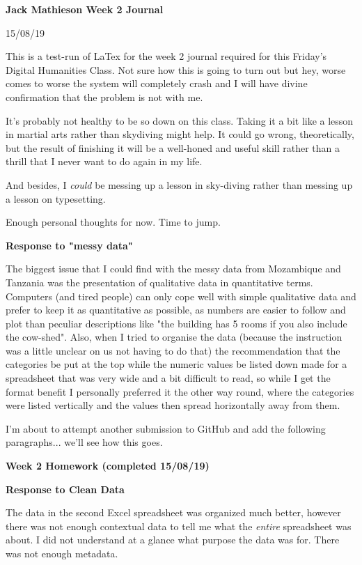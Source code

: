 \documentclass{article}
\begin{document}
\textbf{Jack Mathieson Week 2 Journal}

15/08/19

This is a test-run of LaTex for the week 2 journal required for this Friday's Digital Humanities Class. Not sure how this is going to turn out but hey, worse comes to worse the system will completely crash and I will have divine confirmation that the problem is not with me.

It's probably not healthy to be so down on this class. Taking it a bit like a lesson in martial arts rather than skydiving might help. It could go wrong, theoretically, but the result of finishing it will be a well-honed and useful skill rather than a thrill that I never want to do again in my life.

And besides, I \textit{could} be messing up a lesson in sky-diving rather than messing up a lesson on typesetting.

Enough personal thoughts for now. Time to jump.

\textbf{Response to "messy data"}

The biggest issue that I could find with the messy data from Mozambique and Tanzania was the presentation of qualitative data in quantitative terms. Computers (and tired people) can only cope well with simple qualitative data and prefer to keep it as quantitative as possible, as numbers are easier to follow and plot than peculiar descriptions like "the building has 5 rooms if you also include the cow-shed". Also, when I tried to organise the data (because the instruction was a little unclear on us not having to do that) the recommendation that the categories be put at the top while the numeric values be listed down made for a spreadsheet that was very wide and a bit difficult to read, so while I get the format benefit I personally preferred it the other way round, where the categories were listed vertically and the values then spread horizontally away from them.

I'm about to attempt another submission to GitHub and add the following paragraphs... we'll see how this goes.

\textbf{Week 2 Homework (completed 15/08/19)}

\textbf{Response to Clean Data}

The data in the second Excel spreadsheet was organized much better, however there was not enough contextual data to tell me what the \textit{entire} spreadsheet was about. I did not understand at a glance what purpose the data was for. There was not enough metadata.
\end{document}
